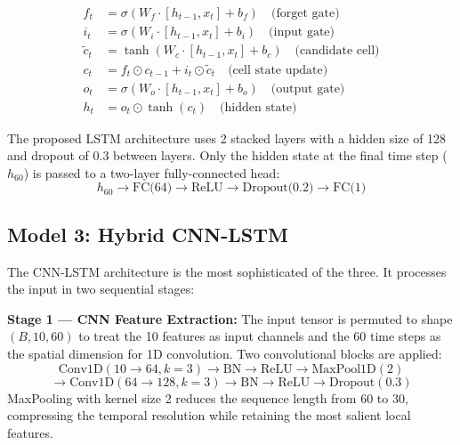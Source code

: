 \documentclass[12pt]{article}
\begin{document}
\begin{align}
    f_t &= \sigma(W_f \cdot [h_{t-1}, x_t] + b_f) \quad \text{(forget gate)} \\
    i_t &= \sigma(W_i \cdot [h_{t-1}, x_t] + b_i) \quad \text{(input gate)} \\
    \tilde{c}_t &= \tanh(W_c \cdot [h_{t-1}, x_t] + b_c) \quad \text{(candidate cell)} \\
    c_t &= f_t \odot c_{t-1} + i_t \odot \tilde{c}_t \quad \text{(cell state update)} \\
    o_t &= \sigma(W_o \cdot [h_{t-1}, x_t] + b_o) \quad \text{(output gate)} \\
    h_t &= o_t \odot \tanh(c_t) \quad \text{(hidden state)}
\end{align}

The proposed LSTM architecture uses 2 stacked layers with a hidden size of 128 and dropout of 0.3 between layers. Only the hidden state at the final time step ($h_{60}$) is passed to a two-layer fully-connected head:
\begin{equation}
    h_{60} \rightarrow \text{FC(64)} \rightarrow \text{ReLU} \rightarrow \text{Dropout(0.2)} \rightarrow \text{FC(1)}
\end{equation}

\subsection{Model 3: Hybrid CNN-LSTM}

The CNN-LSTM architecture is the most sophisticated of the three. It processes the input in two sequential stages:

\textbf{Stage 1 --- CNN Feature Extraction:} The input tensor is permuted to shape $(B, 10, 60)$ to treat the 10 features as input channels and the 60 time steps as the spatial dimension for 1D convolution. Two convolutional blocks are applied:
\begin{equation}
    \text{Conv1D}(10 \rightarrow 64, k=3) \rightarrow \text{BN} \rightarrow \text{ReLU} \rightarrow \text{MaxPool1D}(2)
\end{equation}
\begin{equation}
    \rightarrow \text{Conv1D}(64 \rightarrow 128, k=3) \rightarrow \text{BN} \rightarrow \text{ReLU} \rightarrow \text{Dropout}(0.3)
\end{equation}
MaxPooling with kernel size 2 reduces the sequence length from 60 to 30, compressing the temporal resolution while retaining the most salient local features.
\end{document}
